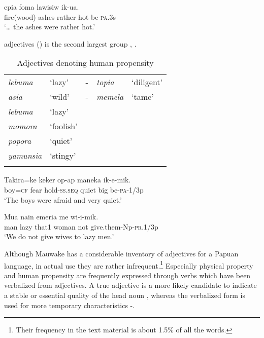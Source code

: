 \ea%
\label{ex:3:x1758}
\gll {\dots}epia foma lawisiw  ik-ua. \\
fire(wood) ashes rather hot be-\textsc{pa}.3s\\
\glt`{\dots} the ashes were rather hot.'
\z

 adjectives () is the second largest group , . 

\begin{table}[t]
\caption{Adjectives denoting human propensity}
\label{tab:3:humanprop}
 
\begin{tabular}{>{\itshape}llc>{\itshape}ll}
\mytoprule
lebuma &`lazy' &- &topia &`diligent'\\
asia &`wild' &- &memela &`tame'\\
lebuma &`lazy'&&&\\
momora &`foolish'&&&\\
popora &`quiet'&&&\\
yamunsia &`stingy'&&&\\
\mybottomrule
\end{tabular}
\end{table}

\ea%
\label{ex:3:x1757}
\gll Takira=ke keker op-ap  maneka ik-e-mik. \\
boy=\textsc{cf} fear hold-\textsc{ss}.\textsc{seq} quiet big be-\textsc{pa}-1/3p\\
\glt`The boys were afraid and very quiet.'
\z

\ea%
\label{ex:3:x1418}
\gll Mua  nain emeria me wi-i-mik. \\
man lazy that1 woman not give.them-Np-\textsc{pr}.1/3p\\
\glt`We do not give wives to lazy men.'
\z

Although Mauwake has a considerable inventory of adjectives for a Papuan language, in actual use they are rather infrequent.\footnote{Their frequency in the text material is about 1.5\% of all the words.} Especially physical property and human propensity are frequently expressed through verbs which have been verbalized from adjectives. A true adjective is a more likely candidate to indicate a stable or essential quality of the head noun , whereas the verbalized form is used for more temporary characteristics -.

